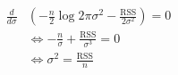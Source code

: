 \documentclass[10pt]{article}
\begin{document}
\begin{align*}\begin{split}
\frac{d}{d \sigma} & \left( -\frac{n}{2}\log{2\pi\sigma^2} - \frac{\mathrm{RSS}}{2\sigma^2}\right)=0 \\
& \Leftrightarrow -\frac{n}{\sigma}+\frac{\mathrm{RSS}}{\sigma^3} = 0 \\
& \Leftrightarrow \sigma^2 = \frac{\mathrm{RSS}}{n}
\end{split}\end{align*}
\end{document}
